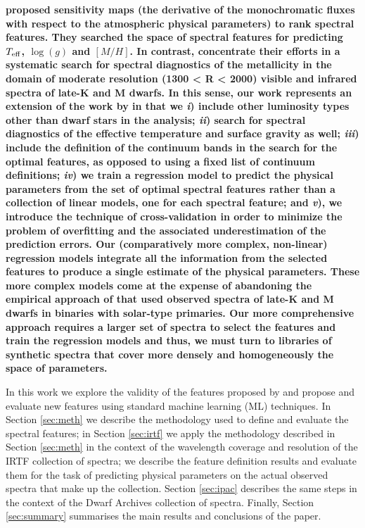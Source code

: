 {\bf \cite{cesetti} proposed sensitivity maps (the derivative of the
monochromatic fluxes with respect to the atmospheric physical
parameters) to rank spectral features. They searched the space of
spectral features for predicting $T_{\rm eff}$, $\log(g)$ and
$[M/H]$. In contrast, \cite{2013AJ....145...52M} concentrate their
efforts in a systematic search for spectral diagnostics of the
metallicity in the domain of moderate resolution (1300 < R < 2000)
visible and infrared spectra of late-K and M dwarfs. In this
sense, our work represents an extension of the work
by \cite{2013AJ....145...52M} in that we {\it i}) include other
luminosity types other than dwarf stars in the analysis; {\it ii})
search for spectral diagnostics of the effective temperature and
surface gravity as well; {\it iii}) include the definition of the
continuum bands in the search for the optimal features, as opposed to
using a fixed list of continuum definitions; {\it iv}) we train a
regression model to predict the physical parameters from the set of
optimal spectral features rather than a collection of linear models,
one for each spectral feature; and {\it v}), we introduce the
technique of cross-validation in order to minimize the problem of
overfitting \citep[see e.g.][]{gelman2013bayesian} and the associated
underestimation of the prediction errors. Our (comparatively more
complex, non-linear) regression models integrate all the information
from the selected features to produce a single estimate of the
physical parameters. These more complex models come at the expense of
abandoning the empirical approach of \cite{2013AJ....145...52M} that
used observed spectra of late-K and M dwarfs in binaries with
solar-type primaries. Our more comprehensive approach requires a
larger set of spectra to select the features and train the regression
models and thus, we must turn to libraries of synthetic spectra that
cover more densely and homogeneously the space of parameters.}

In this work we explore the validity of the features proposed
by \cite{cesetti} and propose and evaluate new features using standard
machine learning (ML) techniques. In Section \ref{sec:meth} we
describe the methodology used to define and evaluate the spectral
features; in Section \ref{sec:irtf} we apply the methodology described
in Section \ref{sec:meth} in the context of the wavelength coverage
and resolution of the IRTF collection of spectra; we describe the
feature definition results and evaluate them for the task of
predicting physical parameters on the actual observed spectra that
make up the collection. Section \ref{sec:ipac} describes the same
steps in the context of the Dwarf Archives collection of
spectra. Finally, Section \ref{sec:summary} summarises the main
results and conclusions of the paper.
